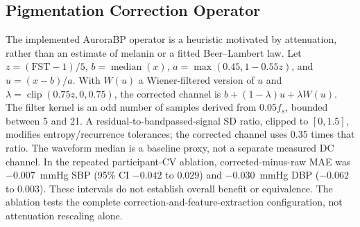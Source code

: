 \documentclass[12pt]{article}
\begin{document}
\subsection{Pigmentation Correction Operator}
\label{sec:pcop}
The implemented AuroraBP operator is a heuristic motivated by attenuation, rather than an estimate of melanin or a fitted Beer--Lambert law. Let $z=(\mathrm{FST}-1)/5$, $b=\operatorname{median}(x)$, $a=\max(0.45,1-0.55z)$, and $u=(x-b)/a$. With $W(u)$ a Wiener-filtered version of $u$ and $\lambda=\operatorname{clip}(0.75z,0,0.75)$, the corrected channel is $b+(1-\lambda)u+\lambda W(u)$. The filter kernel is an odd number of samples derived from $0.05f_s$, bounded between 5 and 21. A residual-to-bandpassed-signal SD ratio, clipped to $[0,1.5]$, modifies entropy/recurrence tolerances; the corrected channel uses 0.35 times that ratio. The waveform median is a baseline proxy, not a separate measured DC channel. In the repeated participant-CV ablation, corrected-minus-raw MAE was $-0.007$~mmHg SBP (95\% CI $-0.042$ to $0.029$) and $-0.030$~mmHg DBP ($-0.062$ to $0.003$). These intervals do not establish overall benefit or equivalence. The ablation tests the complete correction-and-feature-extraction configuration, not attenuation rescaling alone.
\end{document}
